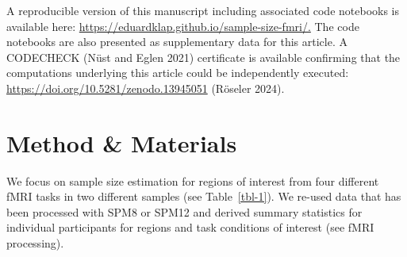 \documentclass[
  letterpaper,
  DIV=11,
  numbers=noendperiod]{scrartcl}
\begin{document}
A reproducible version of this manuscript including associated code
notebooks is available here:
\url{https://eduardklap.github.io/sample-size-fmri/.} The code notebooks
are also presented as supplementary data for this article. A CODECHECK
(Nüst and Eglen 2021) certificate is available confirming that the
computations underlying this article could be independently executed:
\url{https://doi.org/10.5281/zenodo.13945051} (Röseler 2024).

\section{Method \& Materials}\label{method-materials}

We focus on sample size estimation for regions of interest from four
different fMRI tasks in two different samples (see Table~\ref{tbl-1}).
We re-used data that has been processed with SPM8 or SPM12 and derived
summary statistics for individual participants for regions and task
conditions of interest (see fMRI processing).
\end{document}

